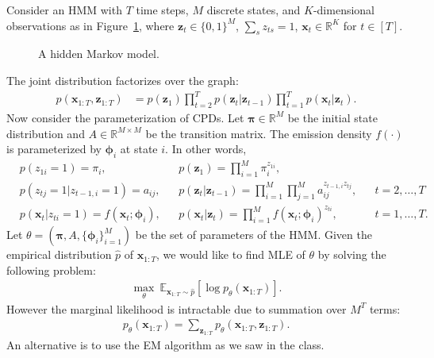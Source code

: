 \documentclass{article}
\begin{document}
\newcommand{\zvec}{\mathbf{z}}
\newcommand{\xvec}{\mathbf{x}}
\newcommand{\Rbb}{\mathbb{R}}
\newcommand{\vpi}{\boldsymbol{\pi}}
\newcommand{\vphi}{\boldsymbol{\phi}}
\newcommand{\muvec}{\boldsymbol{\mu}}
\newcommand{\empirical}{\widehat{p}}
\newcommand{\Ebb}{\mathbb{E}}
\newcommand{\sbr}[1]{\left[#1\right]}
\newcommand*{\argmax}{\mathop{\mathrm{argmax}}}
\newcommand{\alphahat}{\hat{\alpha}}
\newcommand{\alphatil}{\tilde{\alpha}}
\newcommand{\betahat}{\hat{\beta}}
\newcommand{\betatil}{\tilde{\beta}}


Consider an HMM with $ T $ time steps, $ M $ discrete states, and $ K $-dimensional observations as in Figure~\ref{fig:hmm}, where $ \zvec_t \in \{0,1\}^M $, $ \sum_s z_{ts} = 1 $, $ \xvec_t \in \Rbb^K $ for $ t \in [T] $.

\begin{figure}[h]
\centering
{}
\caption{A hidden Markov model.}
\label{fig:hmm}
\end{figure}
%
The joint distribution factorizes over the graph:
\begin{align}\label{eqn:joint-factorization}
p(\xvec_{1:T}, \zvec_{1:T})
& = 
p(\zvec_1) 
\prod_{t=2}^{T} p(\zvec_t | \zvec_{t-1} )  
\prod_{t=1}^{T} p(\xvec_t | \zvec_t).
\end{align}
%
Now consider the parameterization of CPDs. 
Let $ \vpi \in \mathbb{R}^{M} $ be the initial state distribution and $ A \in \mathbb{R}^{M \times M} $ be the transition matrix.
The emission density $ f(\cdot) $ is parameterized by $ \vphi_i $ at state $ i $.
In other words,
\begin{align}
& p(z_{1i} = 1)  = \pi_i, & 
& p(\zvec_1) = \prod_{i=1}^{M} \pi_i^{z_{1i}}, & 
&  & \\
& p(z_{tj} = 1 | z_{t-1,i} = 1)  = a_{ij}, & 
& p(\zvec_t | \zvec_{t-1}) = \prod_{i=1}^{M} \prod_{j=1}^{M} a_{ij}^{ z_{t-1,i} z_{tj} }, & 
& t =2, \dotsc, T & \\
& p(\xvec_t | z_{ti} = 1) = f(\xvec_t; \vphi_i), & 
& p(\xvec_t | \zvec_t) = \prod_{i=1}^{M} f(\xvec_t; \vphi_i)^{ z_{ti} } , & 
& t = 1, \dotsc, T. &
\end{align}
Let $ \theta = (\vpi, A, \{ \vphi_i \}_{i=1}^M) $ be the set of parameters of the HMM.
Given the empirical distribution $ \empirical $ of $ \xvec_{1:T} $, we would like to find MLE of $ \theta $ by solving the following problem:
\begin{align}
\max_\theta \ \Ebb_{\xvec_{1:T} \sim \empirical} \sbr{ \log p_\theta(\xvec_{1:T})  }.
\end{align}
However the marginal likelihood is intractable due to summation over $ M^T $ terms:
\begin{align}
p_\theta(\xvec_{1:T}) 
= \sum_{\zvec_{1:T}} p_\theta(\xvec_{1:T}, \zvec_{1:T}).
\end{align}
An alternative is to use the EM algorithm as we saw in the class. 
\end{document}
